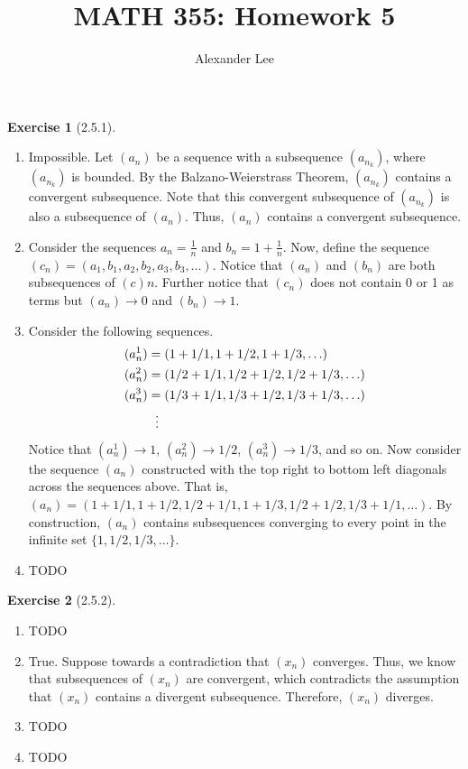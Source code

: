 \documentclass{amsart}
\title{MATH 355: Homework 5}
\author{Alexander Lee}
\theoremstyle{definition}
\newtheorem{exercise}{Exercise}
\begin{document}
\maketitle

\begin{exercise}[2.5.1]
  \begin{enumerate}[label={(\alph*)}]
    \item Impossible. Let $(a_n)$ be a sequence with a subsequence $(a_{n_k})$,
      where $(a_{n_k})$ is bounded. By the Balzano-Weierstrass Theorem,
      $(a_{n_k})$ contains a convergent subsequence. Note that this convergent
      subsequence of $(a_{n_k})$ is also a subsequence of $(a_n)$. Thus, $(a_n)$
      contains a convergent subsequence.
    \item Consider the sequences $a_n = \frac{1}{n}$ and $b_n = 1 +
      \frac{1}{n}$. Now, define the sequence $(c_n) = (a_1, b_1, a_2, b_2, a_3,
      b_3, \ldots)$. Notice that $(a_n)$ and $(b_n)$ are both subsequences of
      $(c)n$. Further notice that $(c_n)$ does not contain 0 or 1 as terms but
      $(a_n) \rightarrow 0$ and $(b_n) \rightarrow 1$.
    \item Consider the following sequences.
      \begin{align*}
        (a^1_n) &= (1 + 1/1, 1 + 1/2, 1 + 1/3, \ldots) \\
        (a^2_n) &= (1/2 + 1/1, 1/2 + 1/2, 1/2 + 1/3, \ldots) \\
        (a^3_n) &= (1/3 + 1/1, 1/3 + 1/2, 1/3 + 1/3, \ldots) \\
        &\vdotswithin{\dots}
      \end{align*}
      Notice that $(a^1_n) \rightarrow 1$, $(a^2_n) \rightarrow 1/2$, $(a^3_n)
      \rightarrow 1/3$, and so on. Now consider the sequence $(a_n)$ constructed
      with the top right to bottom left diagonals across the sequences above.
      That is, $(a_n) = (1 + 1/1, 1 + 1/2, 1/2 + 1/1, 1 + 1/3, 1/2 + 1/2, 1/3 +
      1/1, \ldots)$. By construction, $(a_n)$ contains subsequences converging
      to every point in the infinite set $\{1, 1/2, 1/3, \ldots\}$.
    \item TODO
  \end{enumerate}
\end{exercise}

\begin{exercise}[2.5.2]
  \begin{enumerate}[label={(\alph*)}]
    \item TODO %
    \item True. Suppose towards a contradiction that $(x_n)$ converges. Thus, we
      know that subsequences of $(x_n)$ are convergent, which contradicts the
      assumption that $(x_n)$ contains a divergent subsequence. Therefore,
      $(x_n)$ diverges.
    \item TODO
    \item TODO
  \end{enumerate}
\end{exercise}
\end{document}
